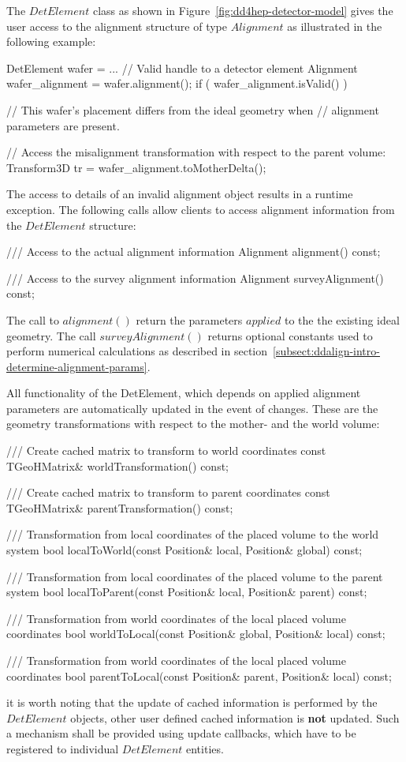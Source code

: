 \documentclass[10pt,a4paper]{article}
\begin{document}
\noindent
The $DetElement$ class as shown in Figure~\ref{fig:dd4hep-detector-model}
gives the user access to the alignment structure of type $Alignment$ as 
illustrated in the following example:
\begin{code}
    DetElement wafer = ... // Valid handle to a detector element
    Alignment  wafer_alignment = wafer.alignment();
    if ( wafer_alignment.isValid() )  {
        // This wafer's placement differs from the ideal geometry when
        // alignment parameters are present.
        
        // Access the misalignment transformation with respect to the parent volume:
        Transform3D tr = wafer_alignment.toMotherDelta();
    }
\end{code}
The access to details of an invalid alignment object results in a runtime 
exception. The following calls allow clients to access alignment information
from the $DetElement$ structure:
\begin{code}
      /// Access to the actual alignment information
      Alignment alignment() const;

      /// Access to the survey alignment information
      Alignment surveyAlignment() const;
\end{code}
The call to $alignment()$ return the parameters $applied$ to the the existing
ideal geometry. The call $surveyAlignment()$ returns optional constants used 
to perform numerical calculations as described in 
section~\ref{subsect:ddalign-intro-determine-alignment-params}.

\noindent
All functionality of the DetElement, which depends on applied alignment parameters
are automatically updated in the event of changes. These are the geometry 
transformations with respect to the mother- and the world volume:
\begin{code}
      /// Create cached matrix to transform to world coordinates
      const TGeoHMatrix& worldTransformation() const;

      /// Create cached matrix to transform to parent coordinates
      const TGeoHMatrix& parentTransformation() const;
 
      /// Transformation from local coordinates of the placed volume to the world system
      bool localToWorld(const Position& local, Position& global) const;

      /// Transformation from local coordinates of the placed volume to the parent system
      bool localToParent(const Position& local, Position& parent) const;

      /// Transformation from world coordinates of the local placed volume coordinates
      bool worldToLocal(const Position& global, Position& local) const;

      /// Transformation from world coordinates of the local placed volume coordinates
      bool parentToLocal(const Position& parent, Position& local) const;
\end{code}
it is worth noting that the update of cached information is performed by the $DetElement$ 
objects, other user defined cached information is {\bf{not}} updated. Such a mechanism
shall be provided using update callbacks, which have to be registered to individual 
$DetElement$ entities.
\end{document}
